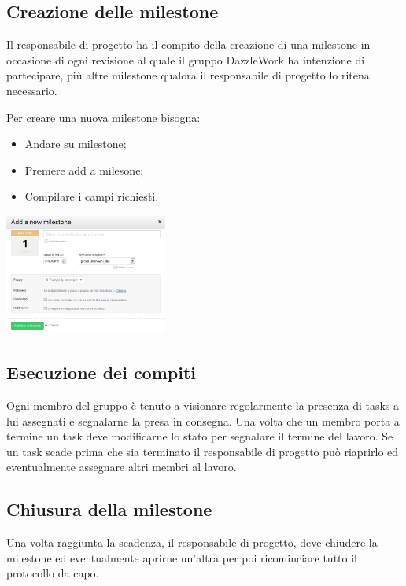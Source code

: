 \subsection{Creazione delle milestone}

Il responsabile di progetto ha il compito della creazione di una milestone in occasione di ogni revisione al quale il gruppo DazzleWork ha intenzione di partecipare, più altre milestone qualora il responsabile di progetto lo ritena necessario.

Per creare una nuova milestone bisogna:

\begin{itemize}
	\item Andare su milestone;
	\item Premere add a milesone;
	\item Compilare i campi richiesti.
\end{itemize}

\includegraphics[height= 4cm] {./img/milestone_fig01.png}

\subsection{Esecuzione dei compiti}

Ogni membro del gruppo è tenuto a visionare regolarmente la presenza di tasks a lui assegnati e segnalarne la presa in consegna.
Una volta che un membro porta a termine un task deve modificarne lo stato per segnalare il termine del lavoro.
Se un task scade prima che sia terminato il responsabile di progetto può riaprirlo ed eventualmente assegnare altri membri al lavoro.

\subsection{Chiusura della milestone}

Una volta raggiunta la scadenza, il responsabile di progetto, deve chiudere la milestone ed eventualmente aprirne un'altra per poi ricominciare tutto il protocollo da capo.